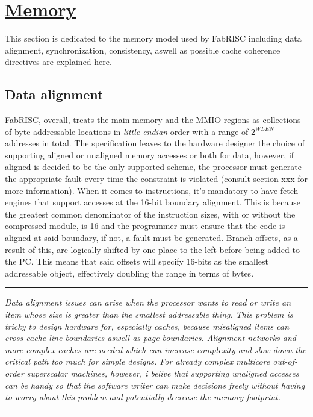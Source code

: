 \documentclass{article}
\begin{document}
    \clearpage


    \section[Memory]{\LARGE\underline{Memory}}

        This section is dedicated to the memory model used by FabRISC including data alignment, synchronization, consistency, aswell as possible cache coherence directives are explained here.

        \subsection[Data alignment]{Data alignment}

            FabRISC, overall, treats the main memory and the MMIO regions as collections of byte addressable locations in \textit{little endian} order with a range of $2^{WLEN}$ addresses in total. The specification leaves to the hardware designer the choice of supporting aligned or unaligned memory accesses or both for data, however, if aligned is decided to be the only supported scheme, the processor must generate the appropriate fault every time the constraint is violated (consult section xxx for more information). When it comes to instructions, it's mandatory to have fetch engines that support accesses at the 16-bit boundary alignment. This is because the greatest common denominator of the instruction sizes, with or without the compressed module, is 16 and the programmer must ensure that the code is aligned at said boundary, if not, a fault must be generated. Branch offsets, as a result of this, are logically shifted by one place to the left before being added to the PC. This means that said offsets will specify 16-bits as the smallest addressable object, effectively doubling the range in terms of bytes.

        \par\noindent\rule{\textwidth}{0.4pt}
        \textit{Data alignment issues can arise when the processor wants to read or write an item whose size is greater than the smallest addressable thing. This problem is tricky to design hardware for, especially caches, because misaligned items can cross cache line boundaries aswell as page boundaries. Alignment networks and more complex caches are needed which can increase complexity and slow down the critical path too much for simple designs. For already complex multicore out-of-order superscalar machines, however, i belive that supporting unaligned accesses can be handy so that the software writer can make decisions freely without having to worry about this problem and potentially decrease the memory footprint.}
        \par\noindent\rule{\textwidth}{0.4pt}
\end{document}
